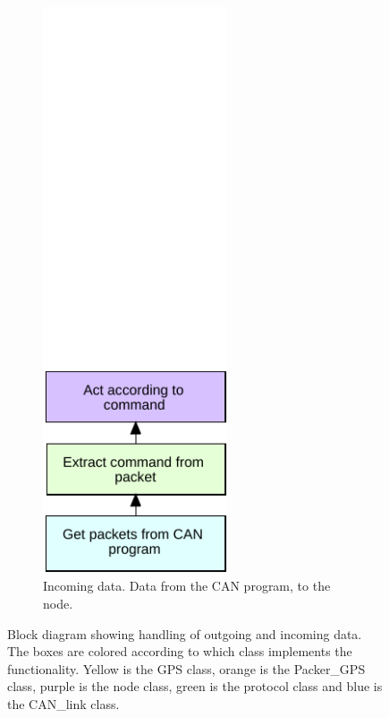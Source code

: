 \begin{figure}[!h]
\begin{subfigure}{0.45\textwidth}
\includegraphics[width=0.60\textwidth]{graphics/FlowChart_Node_Unpacking}
\caption{Incoming data. Data from the CAN program, to the node.}
\label{fig:filter_2}
\end{subfigure}
\caption{Block diagram showing handling of outgoing and incoming data. The boxes are colored according to which class implements the functionality. 
Yellow is the GPS class, orange is the Packer\_GPS class, purple is the node class, green is the protocol class and blue is the CAN\_link class.}
\label{fig:flow_flow}
\end{figure}

